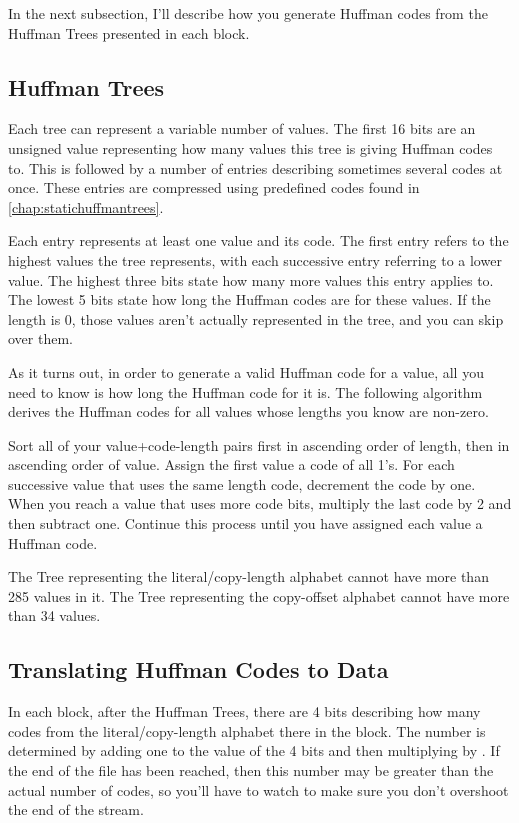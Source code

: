 In the next subsection, I'll describe how you generate Huffman codes from the
Huffman Trees presented in each block.

\subsection{Huffman Trees}
\label{subsec:huffmantrees}

Each tree can represent a variable number of values.  The first 16 bits are an
unsigned value representing how many values this tree is giving Huffman codes
to.  This is followed by a number of entries describing sometimes several codes
at once.  These entries are compressed using predefined codes found in
\autoref{chap:statichuffmantrees}.

Each entry represents at least one value and its code.  The first entry refers
to the highest values the tree represents, with each successive entry referring
to a lower value.  The highest three bits state how many more values this entry
applies to.  The lowest 5 bits state how long the Huffman codes are for these
values.  If the length is 0, those values aren't actually represented in the
tree, and you can skip over them.

As it turns out, in order to generate a valid Huffman code for a value, all you
need to know is how long the Huffman code for it is.  The following algorithm
derives the Huffman codes for all values whose lengths you know are non-zero.

Sort all of your value+code-length pairs first in ascending order of length,
then in ascending order of value.  Assign the first value a code of all 1's.
For each successive value that uses the same length code, decrement the code by
one.  When you reach a value that uses more code bits, multiply the last code by
2 and then subtract one.  Continue this process until you have assigned each
value a Huffman code.

The Tree representing the literal/copy-length alphabet cannot have more than
285 values in it. The Tree representing the copy-offset alphabet cannot have
more than 34 values.

\subsection{Translating Huffman Codes to Data}
\label{subsec:codetodata}

In each block, after the Huffman Trees, there are 4 bits describing how many
codes from the literal/copy-length alphabet there in the block.  The number is
determined by adding one to the value of the 4 bits and then multiplying by
.  If the end of the file has been reached, then this number may be
greater than the actual number of codes, so you'll have to watch to make sure
you don't overshoot the end of the stream.


